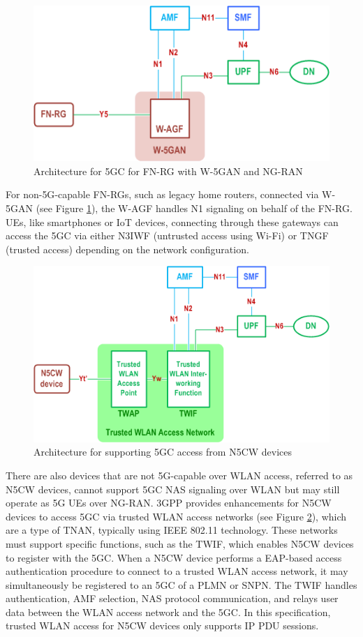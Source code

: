 \begin{figure}
    \centering
    \includegraphics[width=0.5\linewidth]{figs/Architecture for 5G Core Network for FN-RG with Wireline 5G Access network and NG RAN.png}
    \caption{Architecture for \acl{5GC} for \ac{FN-RG} with \ac{W-5GAN} and \ac{NG-RAN}}
    \label{fig:Architecture for 5G Core Network for FN-RG with Wireline 5G Access network and NG RAN}
\end{figure}

For non-\ac{5G}-capable \acp{FN-RG}, such as legacy home routers, connected via \ac{W-5GAN} (see Figure \ref{fig:Architecture for 5G Core Network for FN-RG with Wireline 5G Access network and NG RAN}), the \ac{W-AGF} handles N1 signaling on behalf of the \ac{FN-RG}. \acp{UE}, like smartphones or \ac{IoT} devices, connecting through these gateways can access the \ac{5GC} via either \ac{N3IWF} (untrusted access using Wi-Fi) or \ac{TNGF} (trusted access) depending on the network configuration.

\begin{figure}
    \centering
    \includegraphics[width=0.5\linewidth]{figs/Architecture for supporting 5GC access from N5CW devices.png}
    \caption{Architecture for supporting \ac{5GC} access from \ac{N5CW} devices}
    \label{fig:Architecture for supporting 5GC access from N5CW devices}
\end{figure}

There are also devices that are not \ac{5G}-capable over \ac{WLAN} access, referred to as \ac{N5CW} devices, cannot support \ac{5GC} \ac{NAS} signaling over \ac{WLAN} but may still operate as \ac{5G} \acp{UE} over \ac{NG-RAN}. \ac{3GPP} provides enhancements for N5CW devices to access \ac{5GC} via trusted \ac{WLAN} access networks (see Figure \ref{fig:Architecture for supporting 5GC access from N5CW devices}), which are a type of \ac{TNAN}, typically using IEEE 802.11 technology. These networks must support specific functions, such as the \ac{TWIF}, which enables \ac{N5CW} devices to register with the \ac{5GC}. When a \ac{N5CW} device performs a \ac{EAP}-based access authentication procedure to connect to a trusted \ac{WLAN} access network, it may simultaneously be registered to an \ac{5GC} of a \ac{PLMN} or \ac{SNPN}. The \ac{TWIF} handles authentication, \ac{AMF} selection, \ac{NAS} protocol communication, and relays user data between the \ac{WLAN} access network and the \ac{5GC}. In this specification, trusted \ac{WLAN} access for \ac{N5CW} devices only supports IP \ac{PDU} sessions.

